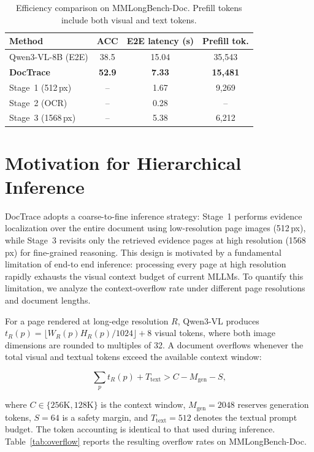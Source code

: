 \documentclass[letterpaper]{article} %
\begin{document}
\begin{table}[h]
\centering
\small
\begin{tabular}{lccc}
\toprule
Method & ACC & E2E latency (s) & Prefill tok. \\
\midrule
Qwen3-VL-8B (E2E) & 38.5 & 15.04 & 35,543 \\
\midrule
\textbf{DocTrace} & \textbf{52.9} & \textbf{7.33} & \textbf{15,481} \\
\quad Stage~1 (512\,px) & -- & 1.67 & 9,269 \\
\quad Stage~2 (OCR) & -- & 0.28 & -- \\
\quad Stage~3 (1568\,px) & -- & 5.38 & 6,212 \\
\bottomrule
\end{tabular}
\caption{
Efficiency comparison on MMLongBench-Doc. Prefill tokens include both visual and text tokens.
}
\label{tab:efficiency}
\end{table}





\section{Motivation for Hierarchical Inference}

DocTrace adopts a coarse-to-fine inference strategy: Stage~1 performs evidence localization over the entire document using low-resolution page images (512\,px), while Stage~3 revisits only the retrieved evidence pages at high resolution (1568\,px) for fine-grained reasoning. This design is motivated by a fundamental limitation of end-to end inference: processing every page at high resolution rapidly exhausts the visual context budget of current MLLMs. To quantify this limitation, we analyze the context-overflow rate under different page resolutions and document lengths.

For a page rendered at long-edge resolution $R$, Qwen3-VL produces $t_R(p)=\lfloor W_R(p)H_R(p)/1024\rfloor+8$ visual tokens, where both image dimensions are rounded to multiples of 32. A document overflows whenever the total visual and textual tokens exceed the available context window:

\begin{equation}
\sum_p t_R(p)+T_{\text{text}}
>
C-M_{\text{gen}}-S,
\label{eq:overflow}
\end{equation}

where $C\in\{256\mathrm{K},128\mathrm{K}\}$ is the context window, $M_{\text{gen}}=2048$ reserves generation tokens, $S=64$ is a safety margin, and $T_{\text{text}}=512$ denotes the textual prompt budget. The token accounting is identical to that used during inference. Table~\ref{tab:overflow} reports the resulting overflow rates on MMLongBench-Doc.
\end{document}
